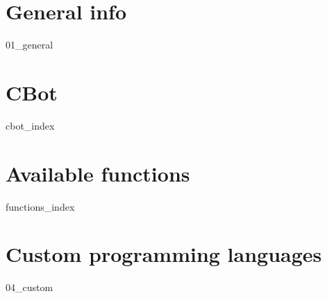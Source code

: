 \chapter{General info}
{01_general}

\chapter{CBot}
{cbot_index}

\chapter{Available functions}
{functions_index}

\chapter{Custom programming languages}
{04_custom}
